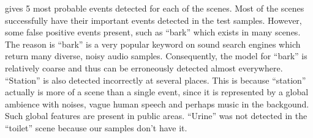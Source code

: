  gives 5 most probable
events detected for each of the scenes. Most of the scenes successfully
have their important events detected in the test samples. However,
some false positive events present, such as ``bark'' which exists in many
scenes. The reason is ``bark'' is a very popular keyword on sound search
engines which return many diverse, noisy audio samples. Consequently,
the model for ``bark'' is relatively coarse and thus can be erroneously
detected almost everywhere. ``Station'' is also detected incorrectly
at several places. This is because ``station'' actually is more of a scene
than a single event, since it is represented by a global ambience with
noises, vague human speech and perhaps music in the backgound. Such global
features are present in public areas. ``Urine'' was not detected in the
``toilet'' scene because our samples don't have it.
%

